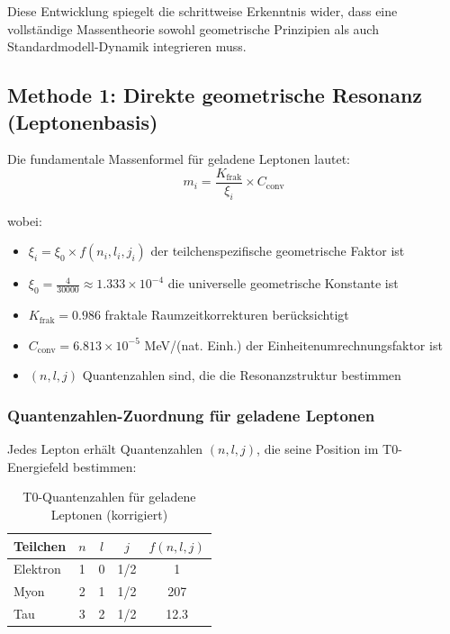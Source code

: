 	Diese Entwicklung spiegelt die schrittweise Erkenntnis wider, dass eine vollständige Massentheorie sowohl geometrische Prinzipien als auch Standardmodell-Dynamik integrieren muss.
	
	\subsection{Methode 1: Direkte geometrische Resonanz (Leptonenbasis)}
	
	Die fundamentale Massenformel für geladene Leptonen lautet:
	\begin{equation}
		\boxed{m_i = \frac{K_{\text{frak}}}{\xi_i} \times C_{\text{conv}}}
		\label{eq:t0_direct_mass}
	\end{equation}
	
	wobei:
	\begin{itemize}
		\item $\xi_i = \xi_0 \times f(n_i, l_i, j_i)$ der teilchenspezifische geometrische Faktor ist
		\item $\xi_0 = \frac{4}{30000} \approx 1.333 \times 10^{-4}$ die universelle geometrische Konstante ist
		\item $K_{\text{frak}} = 0.986$ fraktale Raumzeitkorrekturen berücksichtigt
		\item $C_{\text{conv}} = 6.813 \times 10^{-5}$ MeV/(nat. Einh.) der Einheitenumrechnungsfaktor ist
		\item $(n, l, j)$ Quantenzahlen sind, die die Resonanzstruktur bestimmen
	\end{itemize}
	
	\subsubsection{Quantenzahlen-Zuordnung für geladene Leptonen}
	
	Jedes Lepton erhält Quantenzahlen $(n, l, j)$, die seine Position im T0-Energiefeld bestimmen:
	
	\begin{table}[h]
		\centering
		\begin{tabular}{lcccc}
			\toprule
			\textbf{Teilchen} & \textbf{$n$} & \textbf{$l$} & \textbf{$j$} & \textbf{$f(n,l,j)$} \\
			\midrule
			Elektron & 1 & 0 & 1/2 & 1 \\
			Myon & 2 & 1 & 1/2 & 207 \\
			Tau & 3 & 2 & 1/2 & 12.3 \\
			\bottomrule
		\end{tabular}
		\caption{T0-Quantenzahlen für geladene Leptonen (korrigiert)}
		\label{tab:lepton_qn_direkt}
	\end{table}
	
